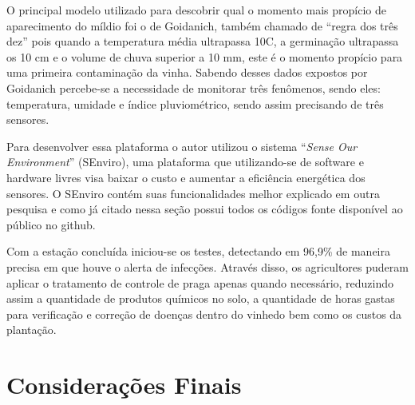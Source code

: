 \documentclass[
article,			%
12pt,				%
oneside,			%
a4paper,			%
english,			%
brazil,				%
sumario=tradicional
]{abntex2}
\begin{document}
O principal modelo utilizado para descobrir qual o momento mais propício de aparecimento do míldio foi o de Goidanich\cite{detectando_milidio}, também chamado de ``regra dos três dez'' pois quando a temperatura média ultrapassa 10\textdegree C, a germinação ultrapassa os 10 cm e o volume de chuva superior a 10 mm, este é o momento propício para uma primeira contaminação da vinha.
Sabendo desses dados expostos por Goidanich\cite{detectando_milidio} percebe-se a necessidade de monitorar três fenômenos, sendo eles: temperatura, umidade e índice pluviométrico, sendo assim precisando de três sensores.

Para desenvolver essa plataforma o autor utilizou o sistema ``\textit{Sense Our Environment}'' (SEnviro), uma plataforma que utilizando-se de software e hardware livres visa baixar o custo e aumentar a eficiência energética dos sensores\cite{2}. O SEnviro contém suas funcionalidades melhor explicado em outra pesquisa\cite{SEnviro} e como já citado nessa seção possui todos os códigos fonte disponível ao público no github\cite{SEnviro_Github}.


Com a estação concluída iniciou-se os testes, detectando em 96,9\% de maneira precisa em que houve o alerta de infecções. Através disso, os agricultores puderam aplicar o tratamento de controle de praga apenas quando necessário, reduzindo assim a quantidade de produtos químicos no solo, a quantidade de horas gastas para verificação e correção de doenças dentro do vinhedo bem como os custos da plantação.

\section{Considerações Finais}

\postextual

\cleardoublepage


%
%
\end{document}
